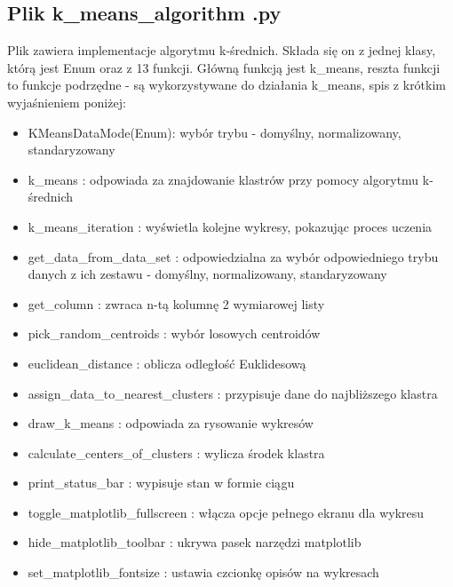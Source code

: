 \documentclass{classrep}
\begin{document}
{	\subsection{Plik k\_means\_algorithm .py}
	{
		Plik zawiera implementacje algorytmu k-średnich. Składa się on z jednej klasy, którą jest Enum oraz z 13 funkcji. Główną funkcją jest k\_means, reszta funkcji to funkcje podrzędne - są wykorzystywane do działania k\_means, spis z krótkim wyjaśnieniem poniżej: 
	\begin{itemize}
		\item KMeansDataMode(Enum): wybór trybu - domyślny, normalizowany, standaryzowany
		\item k\_means : odpowiada za znajdowanie klastrów przy pomocy algorytmu k-średnich
		\item k\_means\_iteration : wyświetla kolejne wykresy, pokazując proces uczenia
		\item get\_data\_from\_data\_set : odpowiedzialna za wybór odpowiedniego trybu danych z ich zestawu - domyślny, normalizowany, standaryzowany
		\item get\_column : zwraca n-tą kolumnę 2 wymiarowej listy
		\item pick\_random\_centroids : wybór losowych centroidów
		\item euclidean\_distance : oblicza odległość Euklidesową
		\item assign\_data\_to\_nearest\_clusters : przypisuje dane do najbliższego klastra
		\item draw\_k\_means : odpowiada za rysowanie wykresów
		\item calculate\_centers\_of\_clusters : wylicza środek klastra
		\item print\_status\_bar : wypisuje stan w formie ciągu
		\item toggle\_matplotlib\_fullscreen : włącza opcje pełnego ekranu dla wykresu
		\item hide\_matplotlib\_toolbar : ukrywa pasek narzędzi matplotlib
		\item set\_matplotlib\_fontsize : ustawia czcionkę opisów na wykresach
	\end{itemize}
	}
}
\end{document}
